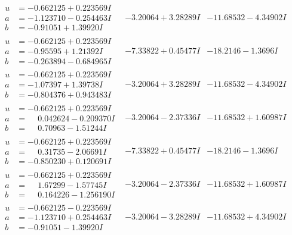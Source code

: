 \documentclass[1p]{elsarticle_modified}
\theoremstyle{definition}
\begin{document}
$$\begin{array}{c|c|c}
\begin{aligned}
u &= -0.662125 + 0.223569 I \\
a &= -1.123710 - 0.254463 I \\
b &= -0.91051 + 1.39920 I\end{aligned}
 & -3.20064 + 3.28289 I & -11.68532 - 4.34902 I \\ \hline\begin{aligned}
u &= -0.662125 + 0.223569 I \\
a &= -0.95595 + 1.21392 I \\
b &= -0.263894 - 0.684965 I\end{aligned}
 & -7.33822 + 0.45477 I & -18.2146 - 1.3696 I \\ \hline\begin{aligned}
u &= -0.662125 + 0.223569 I \\
a &= -1.07397 + 1.39738 I \\
b &= -0.804376 + 0.943483 I\end{aligned}
 & -3.20064 + 3.28289 I & -11.68532 - 4.34902 I \\ \hline\begin{aligned}
u &= -0.662125 + 0.223569 I \\
a &= \phantom{-}0.042624 - 0.209370 I \\
b &= \phantom{-}0.70963 - 1.51244 I\end{aligned}
 & -3.20064 - 2.37336 I & -11.68532 + 1.60987 I \\ \hline\begin{aligned}
u &= -0.662125 + 0.223569 I \\
a &= \phantom{-}0.31735 - 2.06691 I \\
b &= -0.850230 + 0.120691 I\end{aligned}
 & -7.33822 + 0.45477 I & -18.2146 - 1.3696 I \\ \hline\begin{aligned}
u &= -0.662125 + 0.223569 I \\
a &= \phantom{-}1.67299 - 1.57745 I \\
b &= \phantom{-}0.164226 - 1.256190 I\end{aligned}
 & -3.20064 - 2.37336 I & -11.68532 + 1.60987 I \\ \hline\begin{aligned}
u &= -0.662125 - 0.223569 I \\
a &= -1.123710 + 0.254463 I \\
b &= -0.91051 - 1.39920 I\end{aligned}
 & -3.20064 - 3.28289 I & -11.68532 + 4.34902 I \\ \hline\begin{aligned}

\end{aligned}
\end{array}$$
\end{document}
